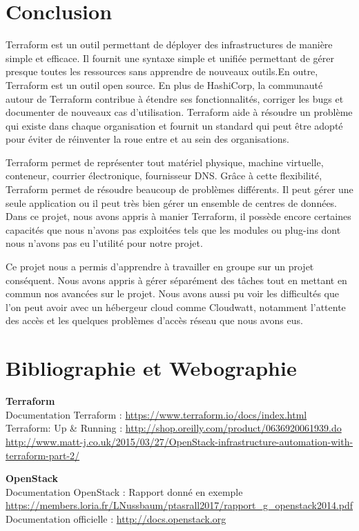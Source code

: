 \documentclass[]{article}
\begin{document}
\section{Conclusion}\label{conclusion}
Terraform est un outil permettant de déployer des
infrastructures de manière simple et efficace. Il fournit une syntaxe
simple et unifiée permettant de gérer presque toutes les ressources sans
apprendre de nouveaux outils.En outre, Terraform est un outil open
source. En plus de HashiCorp, la communauté autour de Terraform
contribue à étendre ses fonctionnalités, corriger les bugs et documenter
de nouveaux cas d'utilisation. Terraform aide à résoudre un problème qui
existe dans chaque organisation et fournit un standard qui peut être
adopté pour éviter de réinventer la roue entre et au sein des
organisations.

Terraform permet de représenter tout matériel physique, machine virtuelle, conteneur, courrier électronique, fournisseur DNS. Grâce à cette flexibilité, Terraform permet de résoudre beaucoup de problèmes différents. Il peut gérer une seule application ou il peut très bien gérer un ensemble de centres de données. Dans ce projet, nous avons appris à manier Terraform, il possède encore certaines capacités que nous n'avons pas exploitées tels que les modules ou plug-ins dont nous n'avons pas eu l'utilité pour notre projet.

Ce projet nous a permis d'apprendre à travailler en groupe sur un projet conséquent. Nous avons appris à gérer séparément des tâches tout en mettant en commun nos avancées sur le projet. Nous avons aussi pu voir les difficultés que l'on peut avoir avec un hébergeur cloud comme Cloudwatt, notamment l'attente des accès et les quelques problèmes d'accès réseau que nous avons eus.

\newpage
\section{Bibliographie et Webographie}

\textbf{Terraform}\\
Documentation Terraform : \url{https://www.terraform.io/docs/index.html} \\
Terraform: Up \& Running : \url{http://shop.oreilly.com/product/0636920061939.do } \\
\url{http://www.matt-j.co.uk/2015/03/27/OpenStack-infrastructure-automation-with-terraform-part-2/}

\textbf{OpenStack}\\
Documentation OpenStack : Rapport donné en exemple \url{https://members.loria.fr/LNussbaum/ptasrall2017/rapport_g_openstack2014.pdf}\\
Documentation officielle : \url{http://docs.openstack.org}
\end{document}
